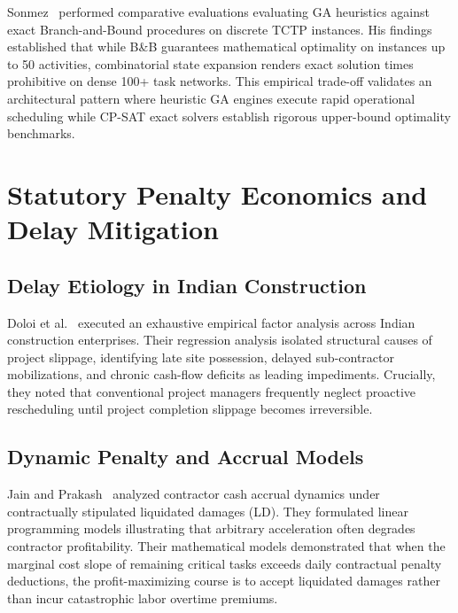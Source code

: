 \documentclass[conference]{IEEEtran}
\begin{document}
Sonmez~\cite{sonmez2011discrete} performed comparative evaluations evaluating GA heuristics against exact Branch-and-Bound procedures on discrete TCTP instances. His findings established that while B\&B guarantees mathematical optimality on instances up to 50 activities, combinatorial state expansion renders exact solution times prohibitive on dense 100+ task networks. This empirical trade-off validates an architectural pattern where heuristic GA engines execute rapid operational scheduling while CP-SAT exact solvers establish rigorous upper-bound optimality benchmarks.

\section{Statutory Penalty Economics and Delay Mitigation}

\subsection{Delay Etiology in Indian Construction}
Doloi et al.~\cite{doloi2012analysing} executed an exhaustive empirical factor analysis across Indian construction enterprises. Their regression analysis isolated structural causes of project slippage, identifying late site possession, delayed sub-contractor mobilizations, and chronic cash-flow deficits as leading impediments. Crucially, they noted that conventional project managers frequently neglect proactive rescheduling until project completion slippage becomes irreversible.

\subsection{Dynamic Penalty and Accrual Models}
Jain and Prakash~\cite{jain2023penalty} analyzed contractor cash accrual dynamics under contractually stipulated liquidated damages (LD). They formulated linear programming models illustrating that arbitrary acceleration often degrades contractor profitability. Their mathematical models demonstrated that when the marginal cost slope of remaining critical tasks exceeds daily contractual penalty deductions, the profit-maximizing course is to accept liquidated damages rather than incur catastrophic labor overtime premiums.
\end{document}
